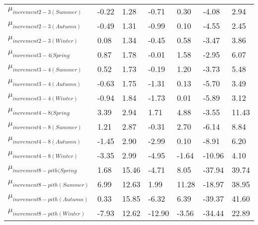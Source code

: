\documentclass{article}\usepackage[]{graphicx}\usepackage[]{color}
\begin{document}
\begin{table}[ht]
\begin{tabular}{|p{}|p{}|p{}|p{}|p{}|p{}|p{}|}
  $\mu_{increment 2-3 (Summer)}$ & -0.22 & 1.28 & -0.71 & 0.30 & -4.08 & 2.94 \\ 
  $\mu_{increment 2-3 (Autumn)}$ & -0.49 & 1.31 & -0.99 & 0.10 & -4.55 & 2.45 \\ 
  $\mu_{increment 2-3 (Winter)}$ & 0.08 & 1.34 & -0.45 & 0.58 & -3.47 & 3.86 \\ 
  $\mu_{increment 3-4 (Spring}$ & 0.87 & 1.78 & -0.01 & 1.58 & -2.95 & 6.07 \\ 
  $\mu_{increment 3-4 (Summer)}$ & 0.52 & 1.73 & -0.19 & 1.20 & -3.73 & 5.48 \\ 
  $\mu_{increment 3-4 (Autumn)}$ & -0.63 & 1.75 & -1.31 & 0.13 & -5.70 & 3.49 \\ 
  $\mu_{increment 3-4 (Winter)}$ & -0.94 & 1.84 & -1.73 & 0.01 & -5.89 & 3.12 \\ 
  $\mu_{increment 4-8 (Spring}$ & 3.39 & 2.94 & 1.71 & 4.88 & -3.55 & 11.43 \\ 
  $\mu_{increment 4-8 (Summer)}$ & 1.21 & 2.87 & -0.31 & 2.70 & -6.14 & 8.84 \\ 
  $\mu_{increment 4-8 (Autumn)}$ & -1.45 & 2.90 & -2.99 & 0.10 & -8.91 & 6.20 \\ 
  $\mu_{increment 4-8 (Winter)}$ & -3.35 & 2.99 & -4.95 & -1.64 & -10.96 & 4.10 \\ 
  $\mu_{increment 8-pith (Spring}$ & 1.68 & 15.46 & -4.71 & 8.05 & -37.94 & 39.74 \\ 
  $\mu_{increment 8-pith (Summer)}$ & 6.99 & 12.63 & 1.99 & 11.28 & -18.97 & 38.95 \\ 
  $\mu_{increment 8-pith (Autumn)}$ & 0.33 & 15.85 & -6.32 & 6.39 & -39.37 & 41.60 \\ 
  $\mu_{increment 8-pith (Winter)}$ & -7.93 & 12.62 & -12.90 & -3.56 & -34.44 & 22.89 \\ 
   \hline
\end{tabular}
\endgroup
\end{table}
\end{document}
